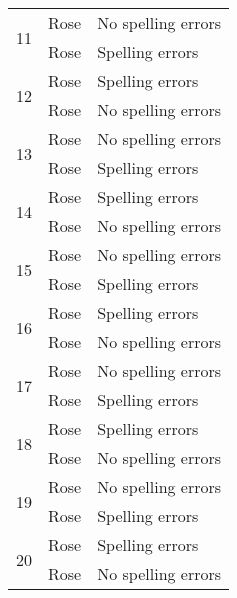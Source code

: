 \begin{table}[!ht]
\begin{center}
\begin{tabular}[center]{| l | l | l |}
         \hline \hline
         \multirow{2}{*}{11} & Rose & No spelling errors \\
                             & Rose & Spelling errors \\
         \hline
         \multirow{2}{*}{12} & Rose & Spelling errors \\
                             & Rose & No spelling errors \\
         \hline
         \multirow{2}{*}{13} & Rose & No spelling errors \\
                             & Rose & Spelling errors \\
         \hline
         \multirow{2}{*}{14} & Rose & Spelling errors \\
                             & Rose & No spelling errors \\
         \hline
         \multirow{2}{*}{15} & Rose & No spelling errors \\
                             & Rose & Spelling errors \\
         \hline
         \multirow{2}{*}{16} & Rose & Spelling errors \\
                             & Rose & No spelling errors \\
         \hline
         \multirow{2}{*}{17} & Rose & No spelling errors \\
                             & Rose & Spelling errors \\
         \hline
         \multirow{2}{*}{18} & Rose & Spelling errors \\
                             & Rose & No spelling errors \\
         \hline
         \multirow{2}{*}{19} & Rose & No spelling errors \\
                             & Rose & Spelling errors \\
         \hline
         \multirow{2}{*}{20} & Rose & Spelling errors \\
                             & Rose & No spelling errors \\
         \hline
      \end{tabular}
   \end{center}
\end{table}
